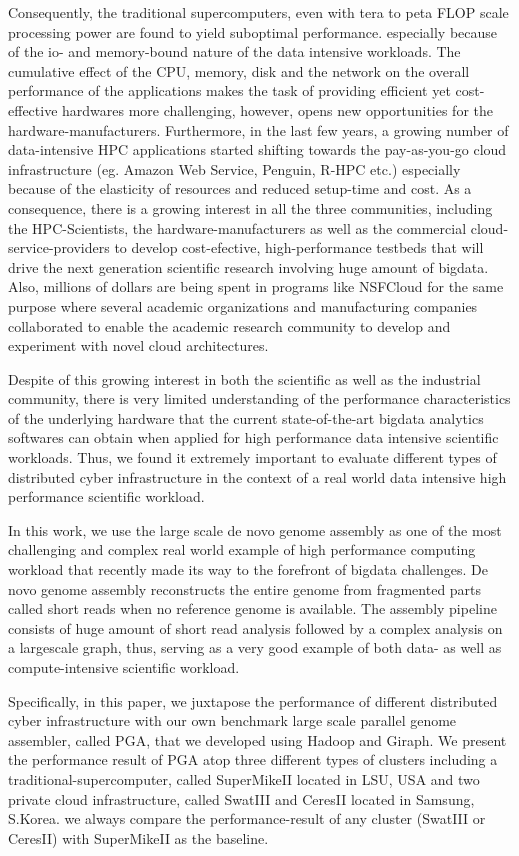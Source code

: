 \documentclass[conference]{IEEEtran}
\begin{document}
Consequently, the traditional supercomputers, even with tera to peta FLOP scale processing power are found to yield suboptimal performance. especially because of the io- and memory-bound nature of the data intensive workloads.
The cumulative effect of the CPU, memory, disk and the network on the overall performance of the applications makes the task of providing efficient yet cost-effective hardwares more challenging, however, opens new opportunities for the hardware-manufacturers.
Furthermore, in the last few years, a growing number of data-intensive HPC applications started shifting towards the pay-as-you-go cloud infrastructure (eg. Amazon Web Service, Penguin, R-HPC etc.) especially because of the elasticity of resources and reduced setup-time and cost. 
As a consequence, there is a growing interest in all the three communities, including the HPC-Scientists, the hardware-manufacturers as well as the commercial cloud-service-providers to develop cost-efective, high-performance testbeds that will drive the next generation scientific research involving huge amount of bigdata.
Also, millions of dollars are being spent in programs like NSFCloud for the same purpose where several academic organizations and manufacturing companies collaborated to enable the academic research community to develop and experiment with novel cloud architectures.

Despite of this growing interest in both the scientific as well as the industrial community, there is very limited understanding of the performance characteristics of the underlying hardware that the current state-of-the-art bigdata analytics softwares can obtain when applied for high performance data intensive scientific workloads. 
Thus, we found it extremely important to evaluate different types of distributed cyber infrastructure in the context of a real world data intensive high performance scientific workload.  

In this work, we use the large scale de novo genome assembly as one of the most challenging and complex real world example of high performance computing workload that recently made its way to the forefront of bigdata challenges.
De novo genome assembly reconstructs the entire genome from fragmented parts called short reads when no reference genome is available.
The assembly pipeline consists of huge amount of short read analysis followed by a  complex analysis on a largescale graph, thus, serving as a very good example of both data- as well as compute-intensive scientific workload.

Specifically, in this paper, we juxtapose the performance of different distributed cyber infrastructure with our own benchmark large scale parallel genome assembler, called PGA, that we developed using Hadoop and Giraph.
We present the performance result of PGA atop three different types of clusters including a traditional-supercomputer, called SuperMikeII located in LSU, USA and two private cloud infrastructure, called SwatIII and CeresII located in Samsung, S.Korea.
we always compare the performance-result of any cluster (SwatIII or CeresII) with SuperMikeII as the baseline.
\end{document}
